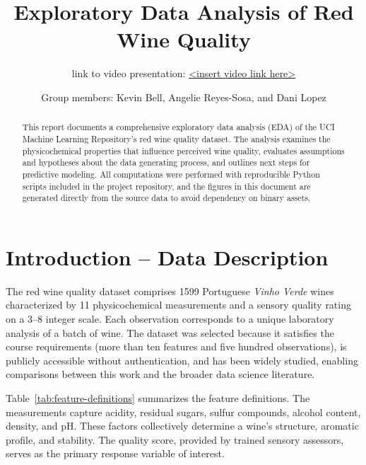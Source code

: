 \documentclass[11pt]{article}
\title{Exploratory Data Analysis of Red Wine Quality}
\author{\vspace{-1em}\small link to video presentation: \url{<insert video link here>}}
\date{Group members: Kevin Bell, Angelie Reyes-Sosa, and Dani Lopez}
\begin{document}
\maketitle

\begin{abstract}
This report documents a comprehensive exploratory data analysis (EDA) of the UCI
Machine Learning Repository's red wine quality dataset. The analysis examines
the physicochemical properties that influence perceived wine quality, evaluates
assumptions and hypotheses about the data generating process, and outlines next
steps for predictive modeling. All computations were performed with reproducible
Python scripts included in the project repository, and the figures in this
document are generated directly from the source data to avoid dependency on
binary assets.
\end{abstract}

\section{Introduction -- Data Description}
The red wine quality dataset comprises \num{1599} Portuguese \emph{Vinho Verde}
wines characterized by \num{11} physicochemical measurements and a sensory
quality rating on a \numrange{3}{8} integer scale. Each observation corresponds
to a unique laboratory analysis of a batch of wine. The dataset was selected
because it satisfies the course requirements (more than ten features and five
hundred observations), is publicly accessible without authentication, and has
been widely studied, enabling comparisons between this work and the broader data
science literature.

Table~\ref{tab:feature-definitions} summarizes the feature definitions.
The measurements capture acidity, residual sugars, sulfur compounds, alcohol
content, density, and pH. These factors collectively determine a wine's
structure, aromatic profile, and stability. The quality score, provided by
trained sensory assessors, serves as the primary response variable of interest.
\end{document}
